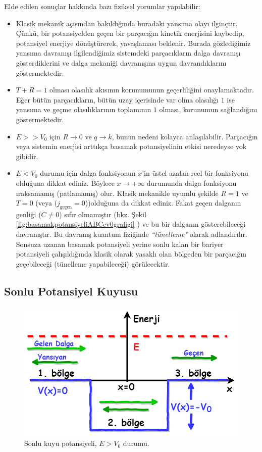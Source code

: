 \documentclass[a4paper,12pt, twoside]{article}
\begin{document}
Elde edilen sonuçlar hakkında bazı fiziksel yorumlar yapılabilir:
\begin{itemize}
	\item Klasik mekanik açısından bakıldığında buradaki yansıma olayı ilginçtir. Çünkü, bir potansiyelden geçen bir parçacığın kinetik enerjisini kaybedip, potansiyel enerjiye dönüştürerek, yavaşlaması beklenir. Burada gözlediğimiz yansıma davranışı ilgilendiğimiz sistemdeki parçacıkların dalga davranışı gösterdiklerini ve dalga mekaniği davranışına uygun davrandıklarını göstermektedir.
	
	\item $T + R = 1$ olması olasılık akısının korunumunun geçerliliğini onaylamaktadır. Eğer bütün parçacıkların, bütün uzay içerisinde var olma olasılığı $1$ ise yansıma ve geçme olasılıklarının toplamının $1$ olması, korunumun sağlandığını göstermektedir.
	
	\item $E>>V_0$ için $R\rightarrow0$ ve $q\rightarrow k$, bunun nedeni kolayca anlaşılabilir. Parçacığın veya sistemin enerjisi arttıkça basamak potansiyelinin etkisi neredeyse yok gibidir.
	
	\item $E<V_0$ durumu için dalga fonksiyonun $x$'in üstel azalan reel bir fonksiyonu olduğuna dikkat ediniz. Böylece $x\rightarrow+\infty$ durumunda dalga fonksiyonu ıraksamamış (patlamamış) olur. Klasik mekanikle uyumlu şekilde $R=1$ ve $T=0$ (veya ($j_\text{geçen} = 0$))olduğuna da dikkat ediniz. Fakat geçen dalganın genliği ($C\neq0$) sıfır olmamıştır (bkz. Şekil \ref{fig:basamakpotansiyeliABCev0grafigi} ) ve bu bir dalganın gösterebileceği davranıştır. Bu davranış kuantum fiziğinde \emph{``tünelleme"} olarak adlandırılır. Sonsuza uzanan basamak potansiyeli yerine sonlu kalan bir bariyer potansiyeli çalışıldığında klasik olarak yasaklı olan bölgeden bir parçacığın geçebileceği (tünelleme yapabileceği) görülecektir. 
	
\end{itemize}

\subsection{Sonlu Potansiyel Kuyusu}

\begin{figure}[hbtp]
	\centering
	\includegraphics[width=0.62\linewidth]{figurler/SonluKuyu_Potansiyeli.png}
	\caption{Sonlu kuyu potansiyeli, $E>V_0$ durumu.}
	\label{fig:sonlukuyupotansiyeli}
\end{figure}
\end{document}
